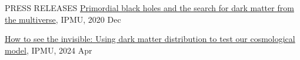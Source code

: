 \begin{rSection}{PRESS RELEASES}
    \href{https://www.ipmu.jp/en/20201224-PBH-multiverse}{Primordial black holes and the search for dark matter from the multiverse}, IPMU, 2020 Dec
  
    \href{https://www.ipmu.jp/en/20230404-darkmatter}{How to see the invisible: Using dark matter distribution to test our cosmological model}, IPMU, 2024 Apr
\end{rSection}
